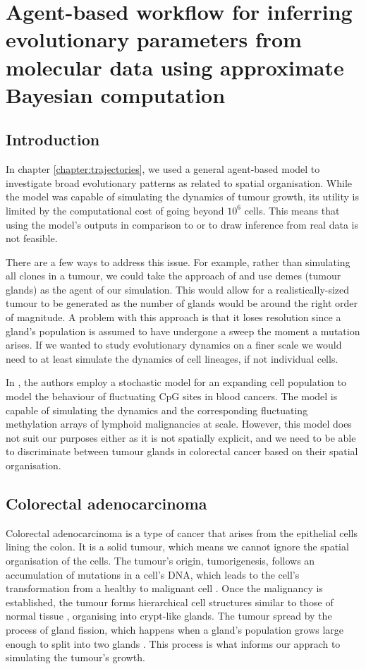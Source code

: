 \chapter{Agent-based workflow for inferring evolutionary parameters from molecular data using approximate Bayesian computation}\label{chapter:methdemon}


\section{Introduction}
In chapter \ref{chapter:trajectories}, we used a general agent-based model to investigate broad evolutionary
patterns as related to spatial organisation. While the model was capable of simulating the dynamics of
tumour growth, its utility is limited by the computational cost of going beyond $10^6$ cells. This means
that using the model's outputs in comparison to or to draw inference from real data is not feasible. \par
There are a few ways to address this issue. For example, rather than simulating all clones in a tumour, we
could take the approach of \cite{sottoriva_big_2015} and use demes (tumour glands) as the agent of our
simulation. This would allow for a realistically-sized tumour to be generated as the number of glands would
be around the right order of magnitude. A problem with this approach is that it loses resolution since a
gland's population is assumed to have undergone a sweep the moment a mutation arises. If we wanted to
study evolutionary dynamics on a finer scale we would need to at least simulate the dynamics of cell
lineages, if not individual cells. \par
In \cite{gabbutt_evolutionary_2023}, the authors employ a stochastic model for an expanding cell population
to model the behaviour of fluctuating CpG sites in blood cancers. The model is capable of simulating the
dynamics and the corresponding fluctuating methylation arrays of lymphoid malignancies at scale. However,
this model does not suit our purposes either as it is not spatially explicit, and we need to be able to
discriminate between tumour glands in colorectal cancer based on their spatial organisation.


\section{Colorectal adenocarcinoma}
Colorectal adenocarcinoma is a type of cancer that arises from the epithelial cells lining the colon.
It is a solid tumour, which means we cannot ignore the spatial organisation of the cells. The tumour's
origin, tumorigenesis, follows an accumulation of mutations in a cell's DNA, which leads to the cell's transformation
from a healthy to malignant cell \cite{fearon_genetic_1990}. Once the malignancy is established, the tumour
forms hierarchical cell structures similar to those of normal tissue \cite{cernat_colorectal_2014}, organising
into crypt-like glands. The tumour spread by the process of gland fission, which happens when a gland's
population grows large enough to split into two glands \cite{preston_bottom-up_2003}. This process is what
informs our apprach to simulating the tumour's growth.


